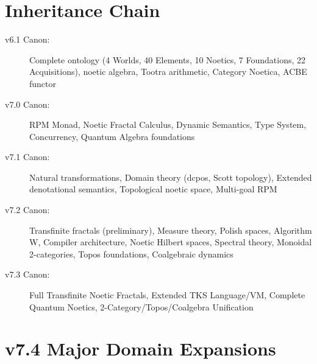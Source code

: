 \documentclass[11pt,twoside,openright]{book}
\theoremstyle{definition}
\theoremstyle{plain}
\theoremstyle{remark}
\begin{document}
\section*{Inheritance Chain}

\begin{description}
    \item[v6.1 Canon:] Complete ontology (4 Worlds, 40 Elements, 10 Noetics, 7 Foundations, 22 Acquisitions), noetic algebra, Tootra arithmetic, Category Noetica, ACBE functor
    
    \item[v7.0 Canon:] RPM Monad, Noetic Fractal Calculus, Dynamic Semantics, Type System, Concurrency, Quantum Algebra foundations
    
    \item[v7.1 Canon:] Natural transformations, Domain theory (dcpos, Scott topology), Extended denotational semantics, Topological noetic space, Multi-goal RPM
    
    \item[v7.2 Canon:] Transfinite fractals (preliminary), Measure theory, Polish spaces, Algorithm W, Compiler architecture, Noetic Hilbert spaces, Spectral theory, Monoidal 2-categories, Topos foundations, Coalgebraic dynamics
    
    \item[v7.3 Canon:] Full Transfinite Noetic Fractals, Extended TKS Language/VM, Complete Quantum Noetics, 2-Category/Topos/Coalgebra Unification
\end{description}

\section*{v7.4 Major Domain Expansions}
\end{document}
